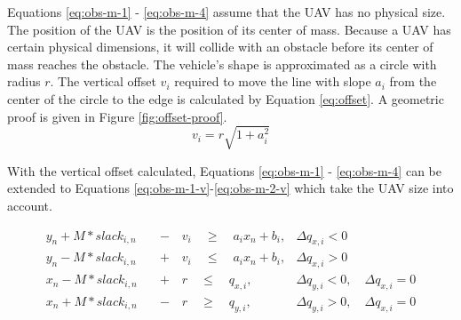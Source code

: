 Equations \ref{eq:obs-m-1} - \ref{eq:obs-m-4} assume that the UAV has no physical size. The position of the UAV is the position of its center of mass. Because a UAV has certain physical dimensions, it will collide with an obstacle before its center of mass reaches the obstacle. The vehicle's shape is approximated as a circle with radius $r$. The vertical offset $v_i$ required to move the line with slope $a_i$ from the center of the circle to the edge is calculated by Equation \ref{eq:offset}. A geometric proof is given in Figure \ref{fig:offset-proof}.
\begin{equation}
v_{i} = r \sqrt{1 + a_i^2}
\label{eq:offset}
\end{equation}

With the vertical offset calculated, Equations \ref{eq:obs-m-1} - \ref{eq:obs-m-4} can be extended to Equations \ref{eq:obs-m-1-v}-\ref{eq:obs-m-2-v} which take the UAV size into account.

\begin{align}
y_{n} + M*slack_{i,n} \quad &- \quad v_i \quad \geq 
\quad a_{i} x_{n} + b_{i},  	
& \Delta q_{x,i} < 0 							 	
\label{eq:obs-m-1-v} \\
y_{n} - M*slack_{i,n} \quad &+ \quad v_i \quad \leq 
\quad a_{i} x_{n} + b_{i},
& \Delta q_{x,i} > 0 							 	
\label{eq:obs-m-2-v} \\
x_{n} - M*slack_{i,n} \quad &+ \quad r \quad \leq
\quad  q_{x,i}, 		
& \Delta q_{y,i} < 0, \quad \Delta q_{x,i} = 0 	
\label{eq:obs-m-3-v} \\
x_{n} + M*slack_{i,n} \quad &- \quad r \quad \geq 
\quad q_{y,i},  		
& \Delta q_{y,i} > 0, \quad \Delta q_{x,i} = 0 	
\label{eq:obs-m-4-v}
\end{align}


